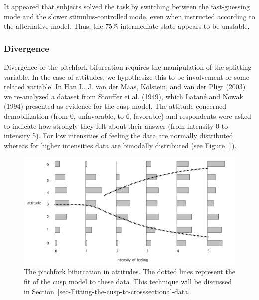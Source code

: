 \documentclass[
  a4paper,
  DIV=11,
  numbers=noendperiod]{scrreprt}
\begin{document}
It appeared that subjects solved the task by switching between the
fast-guessing mode and the slower stimulus-controlled mode, even when
instructed according to the alternative model. Thus, the 75\%
intermediate state appears to be unstable.

\hypertarget{sec-Divergence}{%
\subsubsection{Divergence}\label{sec-Divergence}}

Divergence or the pitchfork bifurcation requires the manipulation of the
splitting variable. In the case of attitudes, we hypothesize this to be
involvement or some related variable. In Han L. J. van der Maas,
Kolstein, and van der Pligt (2003) we re-analyzed a dataset from
Stouffer et al. (1949), which Latané and Nowak (1994) presented as
evidence for the cusp model. The attitude concerned demobilization (from
0, unfavorable, to 6, favorable) and respondents were asked to indicate
how strongly they felt about their answer (from intensity 0 to intensity
5). For low intensities of feeling the data are normally distributed
whereas for higher intensities data are bimodally distributed (see
Figure~\ref{fig-ch3-img21-old-33}).

\begin{figure}

{\centering \includegraphics{media/ch3/ch3-21__figure33.png}

}

\caption{\label{fig-ch3-img21-old-33}The pitchfork bifurcation in
attitudes. The dotted lines represent the fit of the cusp model to these
data. This technique will be discussed in
Section~\ref{sec-Fitting-the-cusp-to-crosssectional-data}.}

\end{figure}
\end{document}
